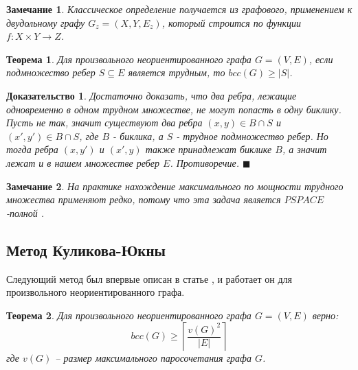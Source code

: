 \documentclass[a4paper]{article}
\newtheorem*{mremark}{Замечание}
\newtheorem*{mtheorem}{Теорема}
\newtheorem*{msolution}{Доказательство}
\begin{document}
\begin{mremark}
	Классическое определение получается из графового, применением к двудольному графу $G_z = (X, Y, E_z)$, 
	который строится по функции $f: X\times Y \rightarrow Z$.
\end{mremark}

	
\begin{mtheorem}
    Для произвольного неориентированного графа $G = (V, E)$, если подмножество ребер $S \subseteq E$ 
    является трудным, то $bcc(G) \geq |S|$.
\end{mtheorem}

\begin{msolution}
    Достаточно доказать, что два ребра, лежащие одновременно в одном трудном множестве, не могут 
    попасть в одну биклику. Пусть не так, значит существуют два ребра $(x, y)\in B\cap S$ и 
    $(x', y')\in B\cap S$, где $B$ - биклика, а $S$ - трудное подмножество ребер. Но тогда ребра 
    $(x, y')$ и $(x', y)$ также принадлежат биклике $B$, а значит лежат и в нашем множестве ребер 
    $E$. Противоречие. $\blacksquare$
\end{msolution}

\begin{mremark}
    На практике нахождение максимального по мощности трудного множества применяют редко, потому что 
    эта задача является $PSPACE$-полной \cite{HermannMarkus}. 
\end{mremark}

\subsection{Метод Куликова-Юкны}
Следующий метод был впервые описан в статье \cite{KulikovJukna}, и работает он для произвольного 
неориентированного графа.

\begin{mtheorem}
    Для произвольного неориентированного графа $G = (V, E)$ верно: $$bcc(G)\geq \left\lceil\frac{v(G)^2}{|E|}\right\rceil$$ 
    где $v(G)$ -- размер максимального паросочетания графа $G$.
\end{mtheorem}
\end{document}
